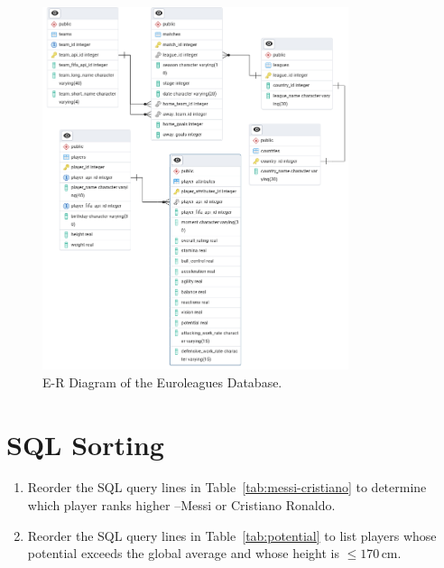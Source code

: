 \documentclass{article}
\begin{document}
\begin{figure}
 \centering
 \includegraphics[width=0.8\textwidth]{figures/Euroleagues_erd.jpg}
 \caption{E-R Diagram of the Euroleagues Database.}
 \label{fig:erd}
\end{figure}

\section{SQL Sorting}

\begin{enumerate}
  \item Reorder the SQL query lines in Table~\ref{tab:messi-cristiano} to determine which player ranks higher --Messi or Cristiano Ronaldo.

  \item Reorder the SQL query lines in Table~\ref{tab:potential} to list players whose potential exceeds the global average and whose height is $\leq 170\,\mathrm{cm}$.
\end{enumerate}
\end{document}
